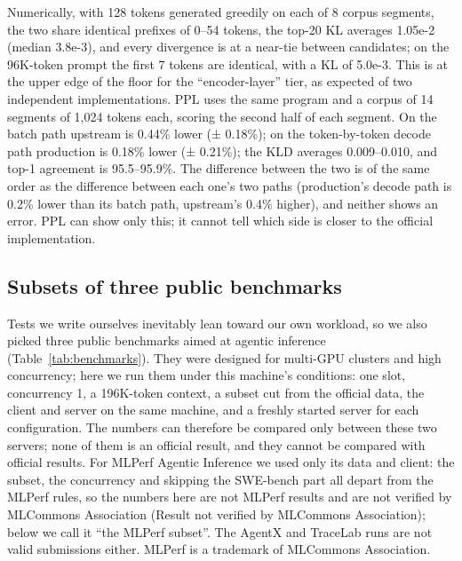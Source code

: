 \documentclass[11pt,a4paper]{article}
\begin{document}
Numerically, with 128 tokens generated greedily on each of 8 corpus segments, the two share identical prefixes of 0--54 tokens, the top-20 KL averages 1.05e-2 (median 3.8e-3), and every divergence is at a near-tie between candidates; on the 96K-token prompt the first 7 tokens are identical, with a KL of 5.0e-3. This is at the upper edge of the floor for the ``encoder-layer'' tier, as expected of two independent implementations. PPL uses the same program and a corpus of 14 segments of 1,024 tokens each, scoring the second half of each segment. On the batch path upstream is 0.44\% lower (± 0.18\%); on the token-by-token decode path production is 0.18\% lower (± 0.21\%); the KLD averages 0.009--0.010, and top-1 agreement is 95.5--95.9\%. The difference between the two is of the same order as the difference between each one's two paths (production's decode path is 0.2\% lower than its batch path, upstream's 0.4\% higher), and neither shows an error. PPL can show only this; it cannot tell which side is closer to the official implementation.

\subsection{Subsets of three public benchmarks}
\label{sec:benchmarks}

Tests we write ourselves inevitably lean toward our own workload, so we also picked three public benchmarks aimed at agentic inference (Table~\ref{tab:benchmarks}). They were designed for multi-GPU clusters and high concurrency; here we run them under this machine's conditions: one slot, concurrency 1, a 196K-token context, a subset cut from the official data, the client and server on the same machine, and a freshly started server for each configuration. The numbers can therefore be compared only between these two servers; none of them is an official result, and they cannot be compared with official results. For MLPerf Agentic Inference we used only its data and client: the subset, the concurrency and skipping the SWE-bench part all depart from the MLPerf rules, so the numbers here are not MLPerf results and are not verified by MLCommons Association (Result not verified by MLCommons Association); below we call it ``the MLPerf subset''. The AgentX and TraceLab runs are not valid submissions either. MLPerf is a trademark of MLCommons Association.
\end{document}

